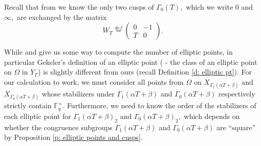 \documentclass[11pt]{amsart}
\theoremstyle{definition}
\numberwithin{equation}{section}
\newcommand{\bbF}{\mathbb{F}}		%
\begin{document}
Recall that from \cite[Section $4$]{Dalal-Kumar-Gamma_0(T)-structure} we know the only two cusps of $\Gamma_0(T),$ which we write $0$ and $\infty,$ are exchanged by the matrix 
\[W_T\overset{def}{=}\left(\begin{array}{cc}0&-1\\T&0\end{array}\right).\]

While \cite[Proposition $7.2$]{Gekeler-Invariants} and \cite[Proposition $7.3$]{Gekeler-Invariants} give us some way to compute the number of elliptic points, in particular Gekeler's definition of an elliptic point (\cite[$(3.2)$]{Gekeler-Invariants} - the class of an elliptic point on $\Omega$ in $Y_{\Gamma}$) is slightly different from ours (recall Definition \ref{d: elliptic pt}). For our calculation to work, we must consider all points from $\Omega$ on $X_{\Gamma_1(\alpha T+\beta)}$ and $X_{\Gamma_0(\alpha T+\beta)}$ whose stabilizers under $\Gamma_1(\alpha T+\beta)$ and $\Gamma_0(\alpha T+\beta)$ respectively strictly contain $\bbF_q^{\times}.$ Furthermore, we need to know the order of the stabilizers of each elliptic point for $\Gamma_1(\alpha T+\beta)_2$ and $\Gamma_0(\alpha T+\beta)_2,$ which depends on whether the congruence subgroups $\Gamma_1(\alpha T+\beta)$ and $\Gamma_0(\alpha T+\beta)$ are ``square'' by Proposition \ref{p: elliptic points and cusps}.\\
\end{document}

